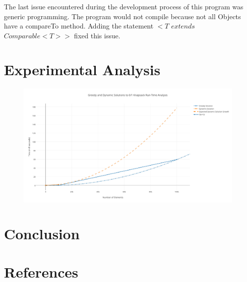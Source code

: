\documentclass[onecolumn, 12pt, article]{IEEEtran}
\numberwithin{case}{problem}
\numberwithin{condition}{problem}
\numberwithin{condition}{subsection}
\numberwithin{definition}{section}
\theoremstyle{remark}
\numberwithin{question}{problem}
\theoremstyle{plain}
\numberwithin{answer}{problem}
\numberwithin{solution}{section}
\numberwithin{equation}{section}%
\begin{document}
The last issue encountered during the development process of this program was generic programming. The program would not compile because not all Objects have a compareTo method. Adding the statement $<T$ $extends$ $Comparable<T>>$ fixed this issue. \cite{erik}


\section{Experimental Analysis}
\begin{figure}[!]
\begin{center}
\includegraphics[scale=.55]{test-results.pdf}
\end{center}
\label{fig:runtime}
\end{figure}


\section{Conclusion}


\newpage

\section*{References}

\end{document}
